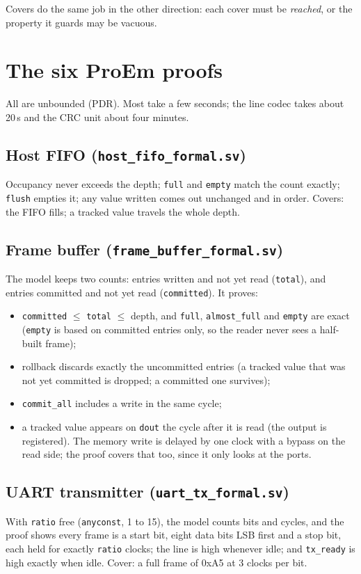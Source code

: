 \documentclass[11pt,a4paper]{article}
\newcommand{\file}[1]{\texttt{#1}}
\begin{document}
Covers do the same job in the other direction: each cover must be \emph{reached}, or the property it guards may be vacuous.

\section{The six ProEm proofs}

All are unbounded (PDR). Most take a few seconds; the line codec takes about 20\,s and the CRC unit about four minutes.

\subsection{Host FIFO (\file{host\_fifo\_formal.sv})}
Occupancy never exceeds the depth; \texttt{full} and \texttt{empty} match the count exactly; \texttt{flush} empties it; any value written comes out unchanged and in order. Covers: the FIFO fills; a tracked value travels the whole depth.

\subsection{Frame buffer (\file{frame\_buffer\_formal.sv})}
The model keeps two counts: entries written and not yet read (\texttt{total}), and entries committed and not yet read (\texttt{committed}). It proves:
\begin{itemize}
\item \texttt{committed} $\le$ \texttt{total} $\le$ depth, and \texttt{full}, \texttt{almost\_full} and \texttt{empty} are exact (\texttt{empty} is based on committed entries only, so the reader never sees a half-built frame);
\item rollback discards exactly the uncommitted entries (a tracked value that was not yet committed is dropped; a committed one survives);
\item \texttt{commit\_all} includes a write in the same cycle;
\item a tracked value appears on \texttt{dout} the cycle after it is read (the output is registered). The memory write is delayed by one clock with a bypass on the read side; the proof covers that too, since it only looks at the ports.
\end{itemize}

\subsection{UART transmitter (\file{uart\_tx\_formal.sv})}
With \texttt{ratio} free (\texttt{anyconst}, 1 to 15), the model counts bits and cycles, and the proof shows every frame is a start bit, eight data bits LSB first and a stop bit, each held for exactly \texttt{ratio} clocks; the line is high whenever idle; and \texttt{tx\_ready} is high exactly when idle. Cover: a full frame of 0xA5 at 3 clocks per bit.
\end{document}
